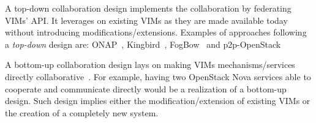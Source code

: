 A top-down collaboration design implements the collaboration by
federating VIMs' API. It leverages on existing VIMs as they are made
available today without introducing modifications/extensions. Examples
of approaches following a \emph{top-down} design are:
ONAP~\cite{onap}, Kingbird~\cite{kingbird},
FogBow~\cite{brasileiro2016fogbow} and
p2p-OpenStack~\cite{ericsson-p2p}

A bottom-up collaboration design lays on making VIMs
mechanisms/services directly collaborative~\cite{7923796}. For example, having two
OpenStack Nova services able to cooperate and communicate directly
would be a realization of a bottom-up design. Such design implies
either the modification/extension of existing VIMs or the creation of
a completely new system.